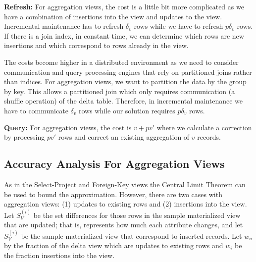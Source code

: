 \textbf{Refresh: } For aggregation views, the cost is a little bit more complicated as we have a combination of insertions into the view and updates to the view. 
Incremental maintenance has to refresh $\delta_v$ rows while we have to refresh $p\delta_v$ rows. 
If there is a join index, in constant time, we can determine which rows are new insertions and which correspond to rows already in the view.

The costs become higher in a distributed environment as we need to consider communication and query processing engines that rely on partitioned joins rather than indices.
For aggregation views, we want to partition the data by the group by key.
This allows a partitioned join which only requires communication (a shuffle operation) of the delta table.
Therefore, in incremental maintenance we have to communicate $\delta_v$ rows while our solution requires $p\delta_v$ rows.

\textbf{Query: } For aggregation views, the cost is $v + pv'$ where we calculate a correction by processing $pv'$ rows and correct an existing aggregation of $v$ records.

\subsection{Accuracy Analysis For Aggregation Views}
As in the Select-Project and Foreign-Key views the Central Limit Theorem can
be used to bound the approximation.
However, there are two cases with aggregation views: (1) updates to existing rows and (2) insertions into the view.
Let $S_{V}^{(i)}$ be the set differences for those rows in the sample materialized view that are updated; that is, represents how much each attribute 
changes, and let $S_{V}^{(i)}$ be the sample materialized view that correspond to inserted records.
Let $w_u$ by the fraction of the delta view which are updates to existing rows and $w_i$ be the fraction insertions into the view.

